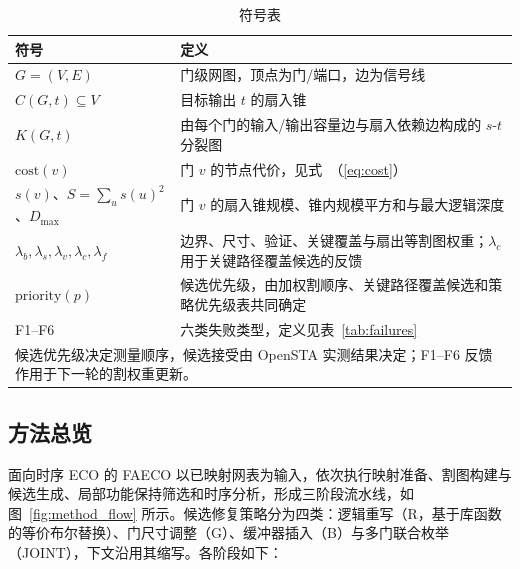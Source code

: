 \documentclass[twocolumn,10pt,fontset=windows]{ctexart}
\renewcommand{\eqref}[1]{\textup{（\ref{#1}）}}
\begin{document}
\begin{table}[ht]
\centering
\caption{符号表}
\label{tab:symbols}
\scriptsize
\setlength{\tabcolsep}{2pt}
\renewcommand{\arraystretch}{0.9}
\begin{tabular}{p{2.6cm}p{4.9cm}}
\toprule
\textbf{符号} & \textbf{定义} \\
\midrule
$G = (V, E)$ & 门级网图，顶点为门/端口，边为信号线 \\
$C(G, t) \subseteq V$ & 目标输出 $t$ 的扇入锥 \\
$K(G, t)$ & 由每个门的输入/输出容量边与扇入依赖边构成的 $s$-$t$ 分裂图 \\
$\mathrm{cost}(v)$ & 门 $v$ 的节点代价，见式~\eqref{eq:cost} \\
$s(v)$、$S=\sum_u s(u)^2$、$D_{\max}$ & 门 $v$ 的扇入锥规模、锥内规模平方和与最大逻辑深度 \\
$\lambda_b,\lambda_s,\lambda_v,\lambda_c,\lambda_f$ & 边界、尺寸、验证、关键覆盖与扇出等割图权重；$\lambda_c$ 用于关键路径覆盖候选的反馈 \\
$\mathrm{priority}(p)$ & 候选优先级，由加权割顺序、关键路径覆盖候选和策略优先级表共同确定 \\
F1--F6 & 六类失败类型，定义见表~\ref{tab:failures} \\
\bottomrule
\multicolumn{2}{p{7.3cm}}{\footnotesize 候选优先级决定测量顺序，候选接受由 OpenSTA 实测结果决定；F1--F6 反馈作用于下一轮的割权重更新。}\\
\end{tabular}
\end{table}

\subsection{方法总览}\label{sec:overview}

面向时序 ECO 的 FAECO 以已映射网表为输入，依次执行映射准备、割图构建与候选生成、局部功能保持筛选和时序分析，形成三阶段流水线，如图~\ref{fig:method_flow} 所示。候选修复策略分为四类：逻辑重写（R，基于库函数的等价布尔替换）、门尺寸调整（G）、缓冲器插入（B）与多门联合枚举（JOINT），下文沿用其缩写。各阶段如下：
\end{document}
